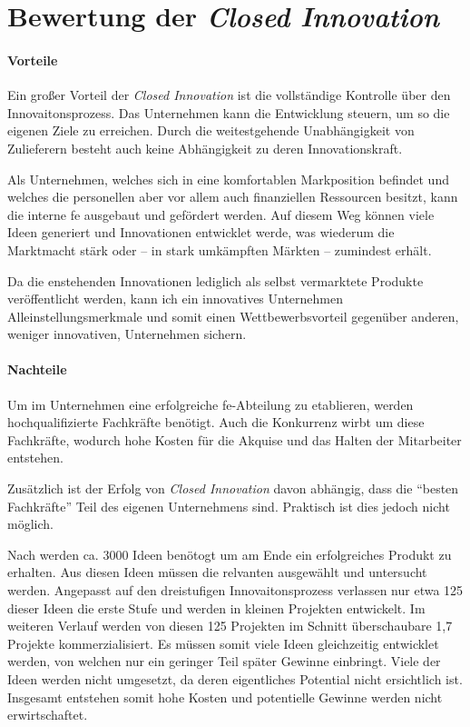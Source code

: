 \section{Bewertung der \textit{Closed Innovation}}\label{sec:bewertung}


\paragraph{Vorteile}\label{sec:bewertung-vor}
Ein großer Vorteil der \textit{Closed Innovation} ist die vollständige Kontrolle über den Innovaitonsprozess.
Das Unternehmen kann die Entwicklung steuern,
um so die eigenen Ziele zu erreichen.
Durch die weitestgehende Unabhängigkeit von Zulieferern besteht auch keine Abhängigkeit zu deren Innovationskraft.

Als Unternehmen, welches sich in eine komfortablen Markposition befindet
und welches die personellen aber vor allem auch finanziellen Ressourcen besitzt,
kann die interne \ac{fe} ausgebaut und gefördert werden.
Auf diesem Weg können viele Ideen generiert und Innovationen entwicklet werde,
was wiederum die Marktmacht stärk oder -- in stark umkämpften Märkten -- zumindest erhält.

Da die enstehenden Innovationen lediglich als selbst vermarktete Produkte veröffentlicht werden,
kann ich ein innovatives Unternehmen Alleinstellungsmerkmale und somit einen Wettbewerbsvorteil gegenüber anderen,
weniger innovativen, Unternehmen sichern.

\paragraph{Nachteile}\label{sec:bewertung-nach}
Um im Unternehmen eine erfolgreiche \ac{fe}-Abteilung zu etablieren,
werden hochqualifizierte Fachkräfte benötigt.
Auch die Konkurrenz wirbt um diese Fachkräfte,
wodurch hohe Kosten für die Akquise und das Halten der Mitarbeiter entstehen.

Zusätzlich ist der Erfolg von \textit{Closed Innovation} davon abhängig,
dass die \enquote{besten Fachkräfte} Teil des eigenen Unternehmens sind.
Praktisch ist dies jedoch nicht möglich.

Nach \cite{stevens19973} werden ca. 3000 Ideen benötogt um am Ende ein erfolgreiches Produkt zu erhalten.
Aus diesen Ideen müssen die relvanten ausgewählt und untersucht werden.
Angepasst auf den dreistufigen Innovaitonsprozess verlassen nur etwa 125 dieser Ideen die erste Stufe
und werden in kleinen Projekten entwickelt.
Im weiteren Verlauf werden von diesen 125 Projekten im Schnitt überschaubare 1,7 Projekte kommerzialisiert.
Es müssen somit viele Ideen gleichzeitig entwicklet werden,
von welchen nur ein geringer Teil später Gewinne einbringt.
Viele der Ideen werden nicht umgesetzt, da deren eigentliches Potential nicht ersichtlich ist.
Insgesamt entstehen somit hohe Kosten und potentielle Gewinne werden nicht erwirtschaftet.

